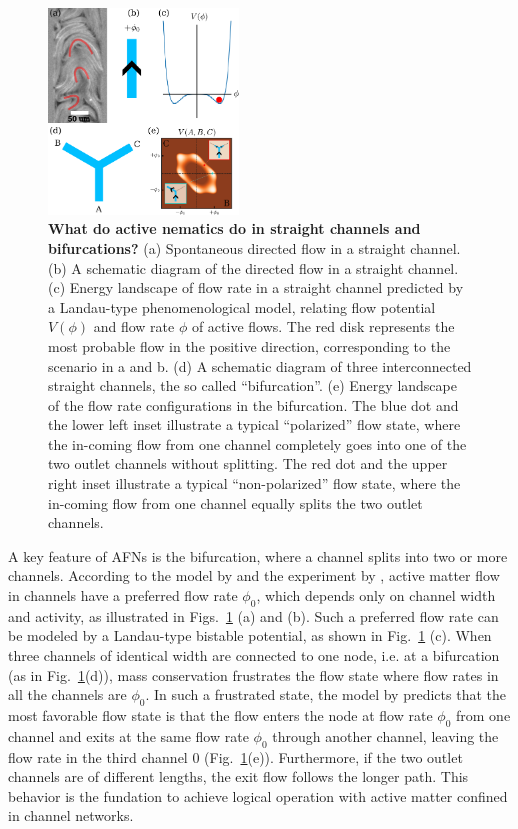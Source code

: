 \documentclass[%
10pt,
superscriptaddress,
twocolumn,
 amsmath,amssymb,
 aps,prx,
]{revtex4-2}
\begin{document}
\begin{figure}[!h]
    \includegraphics[width=0.45\textwidth]{1-bifurcation-question}
    \caption{
    \textbf{What do active nematics do in straight channels and bifurcations?}
    (a) Spontaneous directed flow in a straight channel.
    (b) A schematic diagram of the directed flow in a straight channel.
    (c) Energy landscape of flow rate in a straight channel predicted by a Landau-type phenomenological model, relating flow potential $V(\phi)$ and flow rate $\phi$ of active flows. 
    The red disk represents the most probable flow in the positive direction, corresponding to the scenario in a and b.
    (d) A schematic diagram of three interconnected straight channels, the so called ``bifurcation''.
    (e) Energy landscape of the flow rate configurations in the bifurcation. 
    The blue dot and the lower left inset illustrate a typical ``polarized'' flow state, where the in-coming flow from one channel completely goes into one of the two outlet channels without splitting. 
    The red dot and the upper right inset illustrate a typical ``non-polarized'' flow state, where the in-coming flow from one channel equally splits the two outlet channels. 
    }
    \label{fig:bifurcation-question}
\end{figure}

A key feature of AFNs is the bifurcation, where a channel splits into two or more channels. 
According to the model by \citet{Woodhouse2017} and the experiment by \citet{Morin2018}, active matter flow in channels have a preferred flow rate $\phi_0$, which depends only on channel width and activity, as illustrated in Figs.~\ref{fig:bifurcation-question} (a) and (b).
Such a preferred flow rate can be modeled by a Landau-type bistable potential, as shown in Fig.~\ref{fig:bifurcation-question} (c).
When three channels of identical width are connected to one node, i.e. at a bifurcation (as in Fig.~\ref{fig:bifurcation-question}(d)), mass conservation frustrates the flow state where flow rates in all the channels are $\phi_0$.
In such a frustrated state, the model by \citet{Woodhouse2017} predicts that the most favorable flow state is that the flow enters the node at flow rate $\phi_0$ from one channel and exits at the same flow rate $\phi_0$ through another channel, leaving the flow rate in the third channel $0$ (Fig.~\ref{fig:bifurcation-question}(e)).
Furthermore, if the two outlet channels are of different lengths, the exit flow follows the longer path.  
This behavior is the fundation to achieve logical operation with active matter confined in channel networks. 
\end{document}
